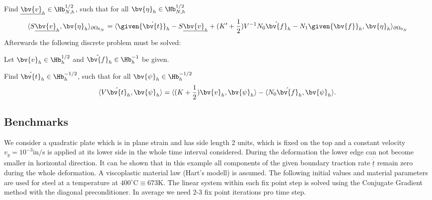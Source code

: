 Find $\underline{\bv{v}}_{h}\in \Hb_{N,h}^{1/2}$, such that for all $\bv{\eta}_{h}\in \Hb_{N,h}^{1/2}$
\begin{equation}
\langle S\underline{\bv{v}}_{h},\bv{\eta}_{h}\rangle_{\partial{\Omega_{0_N}}}=\langle \given{\dot{\bv{t}}}_{h}-S\underline{\bv{v}}_{h}+(K'+\frac{1}{2})V^{-1}N_{0}\hat{\bv{f}}_{h}-N_{1}\given{\bv{f}}_{h},\bv{\eta}_{h}\rangle_{\partial{\Omega_{0_N}}}\label{gal1}
\end{equation} 
Afterwards the following discrete problem must be solved:

Let $\bv{v}_{h}\in \Hb_{h}^{1/2}$ and $\hat{\bv{f}}_{h}\in \Hb_{h}^{-1}$ be given.

Find $\hat{\bv{t}}_{h}\in  \Hb_{h}^{-1/2}$, such that for all $ \bv{\psi}_{h}\in \Hb_{h}^{-1/2}$
\begin{equation}
\langle V\hat{\bv{t}}_{h},\bv{\psi}_{h}\rangle=\langle (K+\frac{1}{2})\bv{v}_{h},\bv{\psi}_{h}\rangle-\langle N_{0}\hat{\bv{f}}_{h},\bv{\psi}_{h}\rangle. \label{gal2}
\end{equation} 


\subsection{Benchmarks}\label{sec:BEM:Benchmarks}
We consider a quadratic plate  which is in plane strain and has side length 2 units, which is fixed on the top and a constant velocity $v_{y}=10^{-3} \text{in}/\text{s}$   is applied at its lower side in the whole time interval considered. During the deformation the lower edge can not become smaller in horizontal direction. It can be shown that in this example all components of the given boundary traction rate $\underline{\overline{\dot{t}}}$ remain zero during the whole deformation. A viscoplastic material law (Hart's modell) is assumed. The following initial values and material parameters are used for steel at a temperature at $400^{\circ}\text{C}\equiv 673\text{K}$. The linear system within each fix point step is solved using the Conjugate Gradient method with the diagonal preconditioner. In average we need 2-3 fix point iterations pro time step.

